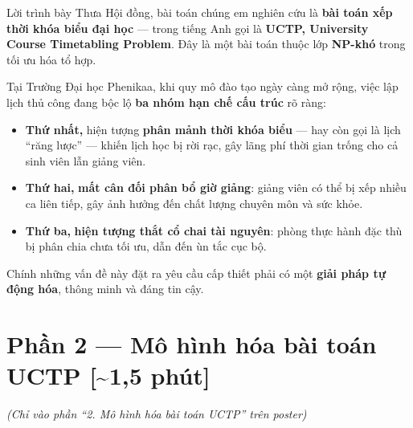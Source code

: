 \documentclass[12pt, a4paper]{article}
\begin{document}
\begin{scriptbox}{Lời trình bày}
Thưa Hội đồng, bài toán chúng em nghiên cứu là \textbf{bài toán xếp thời khóa biểu đại học} --- trong tiếng Anh gọi là \textbf{UCTP, University Course Timetabling Problem}. Đây là một bài toán thuộc lớp \textbf{NP-khó} trong tối ưu hóa tổ hợp.

\medskip
Tại Trường Đại học Phenikaa, khi quy mô đào tạo ngày càng mở rộng, việc lập lịch thủ công đang bộc lộ \textbf{ba nhóm hạn chế cấu trúc} rõ ràng:

\begin{itemize}[leftmargin=1.5cm, itemsep=4pt]
  \item \textbf{Thứ nhất,} hiện tượng \textbf{phân mảnh thời khóa biểu} --- hay còn gọi là lịch ``răng lược'' --- khiến lịch học bị rời rạc, gây lãng phí thời gian trống cho cả sinh viên lẫn giảng viên.
  \item \textbf{Thứ hai,} \textbf{mất cân đối phân bổ giờ giảng}: giảng viên có thể bị xếp nhiều ca liên tiếp, gây ảnh hưởng đến chất lượng chuyên môn và sức khỏe.
  \item \textbf{Thứ ba,} \textbf{hiện tượng thắt cổ chai tài nguyên}: phòng thực hành đặc thù bị phân chia chưa tối ưu, dẫn đến ùn tắc cục bộ.
\end{itemize}

\medskip
Chính những vấn đề này đặt ra yêu cầu cấp thiết phải có một \textbf{giải pháp tự động hóa}, thông minh và đáng tin cậy.
\end{scriptbox}

\section{Phần 2 — Mô hình hóa bài toán UCTP \hfill{\normalfont\color{MidGray}[\textasciitilde{}1,5 phút]}}

\textit{(Chỉ vào phần ``2. Mô hình hóa bài toán UCTP'' trên poster)}
\end{document}
